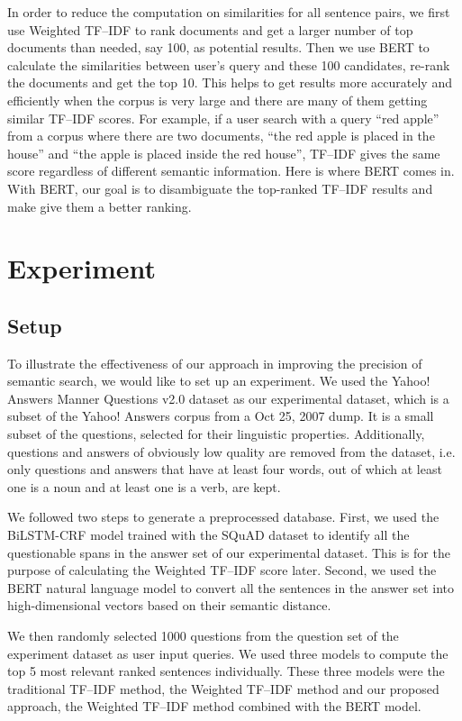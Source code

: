 In order to reduce the computation on similarities for all sentence pairs, we first use Weighted TF--IDF to rank documents and get a larger number of top documents than needed, say 100, as potential results. Then we use BERT to calculate the similarities between user's query and these 100 candidates, re-rank the documents and get the top 10. This helps to get results more accurately and efficiently when the corpus is very large and there are many of them getting similar TF--IDF scores. For example, if a user search with a query ``red apple'' from a corpus where there are two documents, ``the red apple is placed in the house'' and ``the apple is placed inside the red house'', TF--IDF gives the same score regardless of different semantic information. Here is where BERT comes in. With BERT, our goal is to disambiguate the top-ranked TF--IDF results and make give them a better ranking.


\section{Experiment}\label{sec:experiment}

\subsection{Setup}
To illustrate the effectiveness of our approach in improving the precision of semantic search, we would like to set up an experiment. We used the Yahoo! Answers Manner Questions v2.0 dataset as our experimental dataset, which is a subset of the Yahoo! Answers corpus from a Oct 25, 2007 dump. It is a small subset of the questions, selected for their linguistic properties. Additionally, questions and answers of obviously low quality are removed from the dataset, i.e. only questions and answers that have at least four words, out of which at least one is a noun and at least one is a verb, are kept.

We followed two steps to generate a preprocessed database. First, we used the BiLSTM-CRF model trained with the SQuAD dataset to identify all the questionable spans in the answer set of our experimental dataset. This is for the purpose of calculating the Weighted TF--IDF score later. Second, we used the BERT natural language model to convert all the sentences in the answer set into high-dimensional vectors based on their semantic distance.

We then randomly selected 1000 questions from the question set of the experiment dataset as user input queries. We used three models to compute the top 5 most relevant ranked sentences individually. These three models were the traditional TF--IDF method, the Weighted TF--IDF method and our proposed approach, the Weighted TF--IDF method combined with the BERT model.

